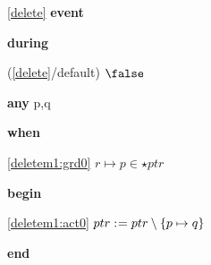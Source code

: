 \noindent \ref{delete}  \textbf{event}
\begin{block}
  \item   \textbf{during}
  \begin{block}
  \item[ (\ref{delete}/default) ]{$\false $} %
  \end{block}
  \item   \textbf{any} p,q
  \item   \textbf{when}
  \begin{block}
  \item[ \eqref{deletem1:grd0} ]{$r \mapsto p \in \star ptr $} %
  \end{block}
  \item   \textbf{begin}
  \begin{block}
  \item[ \eqref{deletem1:act0} ]{$ptr \mathrel{:\mkern1mu=} ptr \setminus \{ p \mapsto q \} $} %
  \end{block}
  \item   \textbf{end} \\
\end{block}
